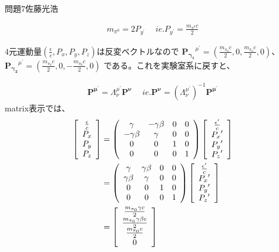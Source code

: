 \documentclass[fleqn]{jbook}
\begin{document}
\begin{answer}{問題7}{佐藤光浩}
\begin{enumerate}
\begin{eqnarray*}
 m_{\pi^0} = 2 P_{y^{\prime}} \hspace{15pt} ie. P_{y^{\prime}} =
 \frac{m_{\pi^0}c}{2}
\end{eqnarray*}

$4$元運動量$(\frac{\epsilon}{c},P_x,P_y,P_z)$は反変ベクトルなので
$\mathbf{P_{{\gamma}_1}}^{\mu^{\prime}}
=\left(\frac{m_{{\pi}_0}c}{2},0,\frac{m_{{\pi}_0}c}{2},0\right)$、
$\mathbf{P_{{\gamma}_2}}^{\mu^{\prime}}
=\left(\frac{m_{{\pi}_0}c}{2},0,-\frac{m_{{\pi}_0}c}{2},0\right)$
である。これを実験室系に戻すと、

\begin{eqnarray*}
 \mathbf{P^{{\mu}^{\prime}}} = \Lambda^{{\mu}^{\prime}}_{\nu}
 \mathbf{P^{\nu}} \hspace{15pt} ie. \mathbf{P^{\nu}} =
 \left(\Lambda^{{\mu}^{\prime}}_{\nu} \right)^{-1}
 \mathbf{P^{{\mu}^{\prime}}} 
\end{eqnarray*}
matrix表示では、
\begin{eqnarray*}
 \left[\begin{array}{c} \frac{\epsilon}{c} \\ P_x\\ P_y\\ P_z
       \end{array} \right] 
 &= \left(\begin{array}{c c c c} \gamma & -\gamma\beta & 0 & 0 \\
 -\gamma\beta & \gamma & 0 & 0 \\ 0 & 0 & 1 & 0 \\ 0 & 0 & 0 & 1 \end{array}
   \right) 
   \left[\begin{array}{c} \frac{\epsilon^{\prime}}{c} \\ {P_x}^{\prime}\\
 {P_y}^{\prime}\\ {P_z}^{\prime}
   \end{array} \right] \\
 &= \left(\begin{array}{c c c c} \gamma & \gamma\beta & 0 & 0 \\
 \gamma\beta & \gamma & 0 & 0 \\ 0 & 0 & 1 & 0 \\ 0 & 0 & 0 & 1 \end{array}
   \right) 
   \left[\begin{array}{c} \frac{\epsilon^{\prime}}{c} \\ {P_x}^{\prime}\\
 {P_y}^{\prime}\\ {P_z}^{\prime}
   \end{array} \right] \\
 &= \left[\begin{array}{c} \frac{m_{{\pi}_0}\gamma c}{2} \\
 \frac{m_{{\pi}_0}\gamma \beta c}{2} \\ \frac{m_{{\pi}_0}c}{2} \\
 0\end{array}
 \right]
\end{eqnarray*}


\end{enumerate}
\end{answer}
\end{document}
